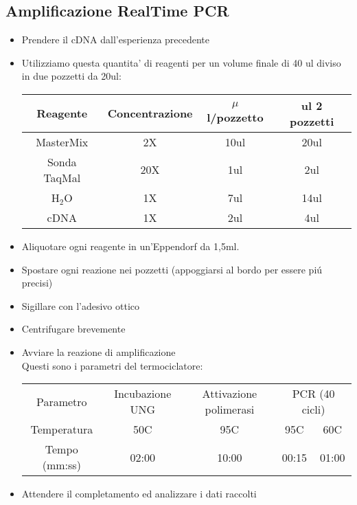 \documentclass{article}
\begin{document}
\subsection{Amplificazione RealTime PCR}
\begin{itemize}
\item Prendere il cDNA dall'esperienza precedente
\item Utilizziamo questa quantita' di reagenti per un volume finale di 40 ul diviso in due pozzetti da 20ul: \\
\begin{tabular}{c c c c}
\hline
Reagente & Concentrazione & $\mu$l/pozzetto & ul 2 pozzetti \\
\hline
MasterMix & 2X & 10ul & 20ul \\
Sonda TaqMal & 20X & 1ul & 2ul \\
H$_2$O & 1X & 7ul & 14ul \\
cDNA & 1X & 2ul & 4ul \\
\end{tabular}
\item Aliquotare ogni reagente in un'Eppendorf da 1,5ml.
\item Spostare ogni reazione nei pozzetti (appoggiarsi al bordo per essere pi\'u precisi)
\item Sigillare con l'adesivo ottico
\item Centrifugare brevemente
\item Avviare la reazione di amplificazione \\
Questi sono i parametri del termociclatore:\\
\begin{tabular}{c c c c c}
\hline
Parametro & Incubazione UNG & Attivazione polimerasi &
\multicolumn{2}{c}{PCR (40 cicli)} \\
Temperatura & 50C & 95C & 95C & 60C \\
Tempo (mm:ss) & 02:00 & 10:00 & 00:15 & 01:00 \\
\end{tabular}
\item Attendere il completamento ed analizzare i dati raccolti
\end{itemize}
\end{document}
